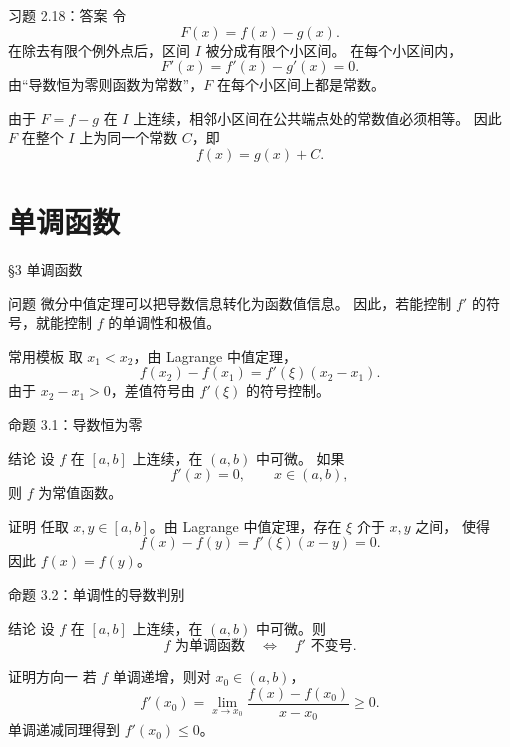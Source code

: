 \documentclass[aspectratio=169,10pt]{ctexbeamer}
\begin{document}
\begin{frame}{习题 2.18：答案}
\small
令
\[
  F(x)=f(x)-g(x).
\]
在除去有限个例外点后，区间 $I$ 被分成有限个小区间。
在每个小区间内，
\[
  F'(x)=f'(x)-g'(x)=0.
\]
由“导数恒为零则函数为常数”，$F$ 在每个小区间上都是常数。

由于 $F=f-g$ 在 $I$ 上连续，相邻小区间在公共端点处的常数值必须相等。
因此 $F$ 在整个 $I$ 上为同一个常数 $C$，即
\[
  f(x)=g(x)+C.
\]
\end{frame}

\section{单调函数}

\begin{frame}{§3 单调函数}
\small
\begin{block}{问题}
微分中值定理可以把导数信息转化为函数值信息。
因此，若能控制 $f'$ 的符号，就能控制 $f$ 的单调性和极值。
\end{block}
\begin{alertblock}{常用模板}
取 $x_1<x_2$，由 Lagrange 中值定理，
\[
  f(x_2)-f(x_1)=f'(\xi)(x_2-x_1).
\]
由于 $x_2-x_1>0$，差值符号由 $f'(\xi)$ 的符号控制。
\end{alertblock}
\end{frame}

\begin{frame}{命题 3.1：导数恒为零}
\small
\begin{block}{结论}
设 $f$ 在 $[a,b]$ 上连续，在 $(a,b)$ 中可微。
如果
\[
  f'(x)=0,\qquad x\in(a,b),
\]
则 $f$ 为常值函数。
\end{block}
\begin{block}{证明}
任取 $x,y\in[a,b]$。由 Lagrange 中值定理，存在 $\xi$ 介于 $x,y$ 之间，
使得
\[
  f(x)-f(y)=f'(\xi)(x-y)=0.
\]
因此 $f(x)=f(y)$。
\end{block}
\end{frame}

\begin{frame}{命题 3.2：单调性的导数判别}
\small
\begin{block}{结论}
设 $f$ 在 $[a,b]$ 上连续，在 $(a,b)$ 中可微。则
\[
  f\text{ 为单调函数}
  \quad\Longleftrightarrow\quad
  f'\text{ 不变号}.
\]
\end{block}
\begin{block}{证明方向一}
若 $f$ 单调递增，则对 $x_0\in(a,b)$，
\[
  f'(x_0)=\lim_{x\to x_0}
  \frac{f(x)-f(x_0)}{x-x_0}\ge0.
\]
单调递减同理得到 $f'(x_0)\le0$。
\end{block}
\end{frame}
\end{document}
